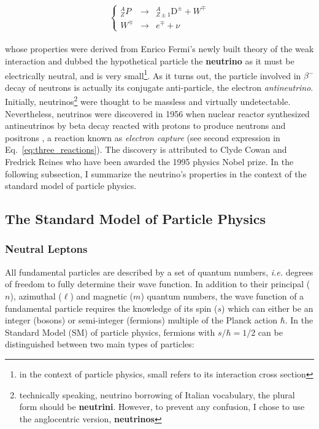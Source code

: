 \begin{equation}
\label{eq:beta_cont}
\left\{
\begin{array}{lcl}
^{A}_{Z}P & \longrightarrow & ^{A}_{Z\pm1}\mathrm{D}^{\pm} + W^{\mp} \\
W^{\mp} & \longrightarrow & e^{\mp} + \nu
\end{array}
\right.
\end{equation} \\ whose properties were derived from Enrico Fermi's newly built theory of the weak interaction and dubbed the hypothetical particle the \textbf{neutrino} as it must be electrically neutral, and is very small\footnote{in the context of particle physics, small refers to its interaction cross section}. As it turns out, the particle involved in $\beta^{-}$ decay of neutrons is actually its conjugate anti-particle, the electron \textit{antineutrino}. Initially, neutrinos\footnote{technically speaking, neutrino borrowing of Italian vocabulary, the plural form should be \textbf{neutrini}. However, to prevent any confusion, I chose to use the anglocentric version, \textbf{neutrinos}} were thought to be massless and virtually undetectable. Nevertheless, neutrinos were discovered in 1956 when nuclear reactor synthesized antineutrinos by beta decay reacted with protons to produce neutrons and positrons \citep{nu_e_discovery}, a reaction known as \textit{electron capture} (see second expression in Eq.~\ref{eq:three_reactions}). The discovery is attributed to Clyde Cowan and Fredrick Reines who have been awarded the 1995 physics Nobel prize. In the following subsection, I summarize the neutrino's properties in the context of the standard model of particle physics.\\

\subsection{The Standard Model of Particle Physics}

\subsubsection{Neutral Leptons}

All fundamental particles are described by a set of quantum numbers, \textit{i.e.} degrees of freedom to fully determine their wave function. In addition to their principal ($n$), azimuthal ($\ell$) and magnetic ($m$) quantum numbers, the wave function of a fundamental particle requires the knowledge of its spin ($s$) which can either be an integer (bosons) or semi-integer (fermions) multiple of the Planck action $\hbar$. In the Standard Model (SM) of particle physics, fermions with $s/\hbar=1/2$ can be distinguished between two main types of particles: \\

